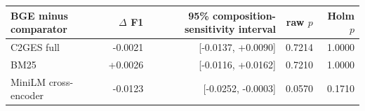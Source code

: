 \begin{tabular}{lrrrr}
\toprule
BGE minus comparator & $\Delta$ F1 & 95\% composition-sensitivity interval & raw $p$ & Holm $p$ \\
\midrule
C2GES full & -0.0021 & [-0.0137, +0.0090] & 0.7214 & 1.0000 \\
BM25 & +0.0026 & [-0.0116, +0.0162] & 0.7210 & 1.0000 \\
MiniLM cross-encoder & -0.0123 & [-0.0252, -0.0003] & 0.0570 & 0.1710 \\
\bottomrule
\end{tabular}
